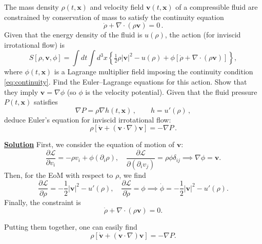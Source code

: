 The mass density $\rho(t,\mathbf{x})$ and velocity field
$\mathbf{v}(t,\mathbf{x})$ of a compressible fluid are constrained by
conservation of mass to satisfy the continuity equation
\begin{equation}
  \dot{\rho} + \nabla\cdot(\rho\mathbf{v}) = 0\,. \tag{$*$}
  \label{eq:continuity}
\end{equation}
Given that the energy density of the fluid is $u(\rho)$, the action (for
inviscid irrotational flow) is
\begin{equation}
  S[\rho,\mathbf{v},\phi] = \int d t\int d^3x\left\{
    \tfrac{1}{2}\rho|\mathbf{v}|^2 - u(\rho)
    + \phi\left[\dot{\rho}+\nabla\cdot(\rho\mathbf{v})\right]
  \right\},
\end{equation}
where $\phi(t,\mathbf{x})$ is a Lagrange multiplier field imposing the
continuity condition \eqref{eq:continuity}. Find the Euler--Lagrange equations
for this action. Show that they imply $\mathbf{v}=\nabla\phi$ (so $\phi$ is
the velocity potential). Given that the fluid pressure $P(t,\mathbf{x})$
satisfies
\begin{equation}
  \nabla P = \rho\nabla h(t,\mathbf{x})\,, \qquad h = u'(\rho)\,,
\end{equation}
deduce Euler's equation for inviscid irrotational flow:
\begin{equation}
  \rho\left[\dot{\mathbf{v}} + (\mathbf{v}\cdot\nabla)\mathbf{v}\right]
  = -\nabla P\,.
\end{equation}

\noindent \underline{\textbf{Solution}} First, we consider the equation of motion of $\mathbf{v}$:
\begin{equation}
    \frac{\partial \mathcal{L}}{\partial v_i} = -\rho v_i + \phi(\partial_i \rho), \quad \frac{\partial \mathcal{L}}{\partial (\partial_i v_j )} = \rho \phi \delta_{ij} \implies \nabla\phi = \mathbf{v}.
\end{equation}
Then, for the EoM with respect to $\rho$, we find
\begin{equation}
    \frac{\partial \mathcal{L}}{\partial \rho} = -\frac{1}{2}|\mathbf{v}|^2 - u'(\rho), \quad \frac{\partial \mathcal{L}}{\partial \dot{\rho}} = \phi
 \implies \dot{\phi} = -\frac{1}{2}|\mathbf{v}|^2 - u'(\rho).
 \end{equation}
 Finally, the constraint is
 \begin{equation}
     \dot{\rho} + \nabla\cdot(\rho\mathbf{v}) = 0.
 \end{equation}

 Putting them together, one can easily find
 \begin{equation}
     \rho\left[\dot{\mathbf{v}} + (\mathbf{v}\cdot\nabla)\mathbf{v}\right]
  = -\nabla P.
 \end{equation}